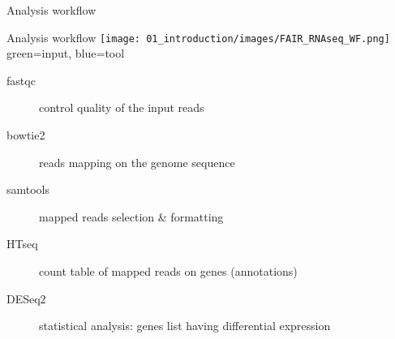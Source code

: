 \begin{frame}{Analysis workflow}
\begin{block}{Analysis workflow}
    \texttt{[image: 01\_introduction/images/FAIR\_RNAseq\_WF.png]}\\
green=input, blue=tool
\end{block}
\footnotesize{
  \begin{description}
    \item[fastqc] control quality of the input reads
    \item[bowtie2] reads mapping on the genome sequence
    \item[samtools] mapped reads selection $\&$ formatting
    \item[HTseq] count table of mapped reads on genes (annotations)
    \item[DESeq2] statistical analysis: genes list having differential expression
  \end{description}
} 
\end{frame}

